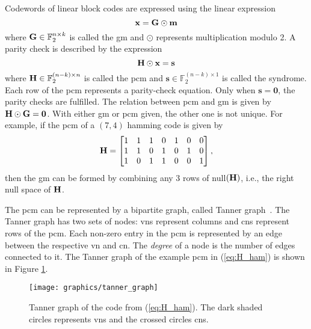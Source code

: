Codewords of linear block codes are expressed using the linear expression $$\mathbf{x}=\mathbf{G}\odot\mathbf{m}$$ where $\mathbf{G}\in\mathbb{F}_2^{n\times k}$ is called the \ac{gm} and $\odot$ represents multiplication modulo 2. A parity check is described by the expression $$\mathbf{H}\odot\mathbf{x}=\mathbf{s}$$ where $\mathbf{H}\in\mathbb{F}_2^{(n-k)\times n}$ is called the \ac{pcm} and $\mathbf{s}\in\mathbb{F}_2^{(n-k)\times 1}$ is called the syndrome. Each row of the \ac{pcm} represents a parity-check equation. Only when $\mathbf{s}=\mathbf{0}$, the parity checks are fulfilled. The relation between \ac{pcm} and \ac{gm} is given by $\mathbf{H}\odot\mathbf{G}=\mathbf{0}$. With either \ac{gm} or \ac{pcm} given, the other one is not unique. For example, if the \ac{pcm} of a $(7,4)$ hamming code is given by
\begin{align} \label{eq:H_ham}
\mathbf{H} =
\begin{bmatrix}
1 &1 &1 &0 &1 &0 &0 \\
1 &1 &0 &1 &0 &1 &0 \\
1 &0 &1 &1 &0 &0 &1
\end{bmatrix},
\end{align}
then the \ac{gm} can be formed by combining any 3 rows of null$(\mathbf{H})$, i.e., the right null space of $\mathbf{H}$.

The \ac{pcm} can be represented by a bipartite graph, called Tanner graph~\cite{Tanner1981}. The Tanner graph has two sets of nodes: \acp{vn} represent columns and \acp{cn} represent rows of the \ac{pcm}. Each non-zero entry in the \ac{pcm} is represented by an edge between the respective \ac{vn} and \ac{cn}. The \emph{degree} of a node is the number of edges connected to it. The Tanner graph of the example \ac{pcm} in (\ref{eq:H_ham}) is shown in Figure \ref{fig:tannGraph}.

\begin{figure}[htbp]
  \centering
  \texttt{[image: graphics/tanner\_graph]}
  \caption{Tanner graph of the code from (\ref{eq:H_ham}). The dark shaded circles represents \acp{vn} and the crossed circles \acp{cn}.}
  \label{fig:tannGraph}
\end{figure}

